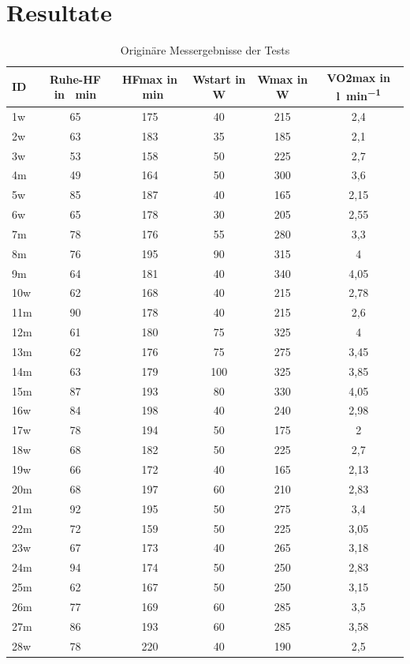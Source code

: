 \chapter{Resultate}

\begin{table}[H]
	\begin{center}
		\caption{Originäre Messergebnisse der Tests}
		\medskip
		\begin{tabulary}{\textwidth}{L C C C C C}
			\toprule
			ID & Ruhe-\acs{HF} in \si{\per\minute} & \acs{HFmax} in \si{\per\minute} & \acs{Wstart} in \si{\watt} & \acs{Wmax} in \si{\watt} & \acs{VO2max} in \si{\litre\per\minute} \\
			\midrule
			\midrule
			1w & 65 & 175 & 40 & 215 & 2,4 \\
			2w & 63 & 183 & 35 & 185 & 2,1 \\
			3w & 53 & 158 & 50 & 225 & 2,7 \\
			4m & 49 & 164 & 50 & 300 & 3,6 \\
			5w & 85 & 187 & 40 & 165 & 2,15 \\
			6w & 65 & 178 & 30 & 205 & 2,55 \\
			7m & 78 & 176 & 55 & 280 & 3,3 \\
			8m & 76 & 195 & 90 & 315 & 4 \\
			9m & 64 & 181 & 40 & 340 & 4,05 \\
			10w & 62 & 168 & 40 & 215 & 2,78 \\
			11m & 90 & 178 & 40 & 215 & 2,6 \\
			12m & 61 & 180 & 75 & 325 & 4 \\
			13m & 62 & 176 & 75 & 275 & 3,45 \\
			14m & 63 & 179 & 100 & 325 & 3,85 \\
			15m & 87 & 193 & 80 & 330 & 4,05 \\
			16w & 84 & 198 & 40 & 240 & 2,98 \\
			17w & 78 & 194 & 50 & 175 & 2 \\
			18w & 68 & 182 & 50 & 225 & 2,7 \\
			19w & 66 & 172 & 40 & 165 & 2,13 \\
			20m & 68 & 197 & 60 & 210 & 2,83 \\
			21m & 92 & 195 & 50 & 275 & 3,4 \\
			22m & 72 & 159 & 50 & 225 & 3,05 \\
			23w & 67 & 173 & 40 & 265 & 3,18 \\
			24m & 94 & 174 & 50 & 250 & 2,83 \\
			25m & 62 & 167 & 50 & 250 & 3,15 \\
			26m & 77 & 169 & 60 & 285 & 3,5 \\
			27m & 86 & 193 & 60 & 285 & 3,58 \\
			28w & 78 & 220 & 40 & 190 & 2,5 \\
			\bottomrule
		\end{tabulary}
		\label{tab:tabelle4}
	\end{center}
\end{table}

